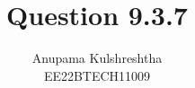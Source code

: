 \documentclass[]{article}
\title{Question 9.3.7}
\author{Anupama Kulshreshtha \\ EE22BTECH11009}
\date{}
\begin{document}
\maketitle
\providecommand{\pr}[1]{\ensuremath{\Pr\left(#1\right)}}
\providecommand{\prt}[2]{\ensuremath{p_{#1}^{\left(#2\right)} }}        %
\providecommand{\qfunc}[1]{\ensuremath{Q\left(#1\right)}}
\providecommand{\sbrak}[1]{\ensuremath{{}\left[#1\right]}}
\providecommand{\lsbrak}[1]{\ensuremath{{}\left[#1\right.}}
\providecommand{\rsbrak}[1]{\ensuremath{{}\left.#1\right]}}
\providecommand{\brak}[1]{\ensuremath{\left(#1\right)}}
\providecommand{\lbrak}[1]{\ensuremath{\left(#1\right.}}
\providecommand{\rbrak}[1]{\ensuremath{\left.#1\right)}}
\providecommand{\cbrak}[1]{\ensuremath{\left\{#1\right\}}}
\providecommand{\lcbrak}[1]{\ensuremath{\left\{#1\right.}}
\providecommand{\rcbrak}[1]{\ensuremath{\left.#1\right\}}}
\newcommand{\sgn}{\mathop{\mathrm{sgn}}}
\providecommand{\abs}[1]{\left\vert#1\right\vert}
\providecommand{\res}[1]{\Res\displaylimits_{#1}} 
\providecommand{\norm}[1]{\left\lVert#1\right\rVert}
\providecommand{\mtx}[1]{\mathbf{#1}}
\providecommand{\mean}[1]{E\left[ #1 \right]}
\providecommand{\cond}[2]{#1\middle|#2}
\providecommand{\fourier}{\overset{\mathcal{F}}{ \rightleftharpoons}}
\newenvironment{amatrix}[1]{%
  \left(\begin{array}{@{}*{#1}{c}|c@{}}
}{%
  \end{array}\right)
}
\newcommand{\solution}{\noindent \textbf{Solution: }}
\newcommand{\cosec}{\,\text{cosec}\,}
\providecommand{\dec}[2]{\ensuremath{\overset{#1}{\underset{#2}{\gtrless}}}}
\newcommand{\myvec}[1]{\ensuremath{\begin{pmatrix}#1\end{pmatrix}}}
\newcommand{\mydet}[1]{\ensuremath{\begin{vmatrix}#1\end{vmatrix}}}
\newcommand{\myaugvec}[2]{\ensuremath{\begin{amatrix}{#1}#2\end{amatrix}}}
\providecommand{\rank}{\text{rank}}
\providecommand{\pr}[1]{\ensuremath{\Pr\left(#1\right)}}
\providecommand{\qfunc}[1]{\ensuremath{Q\left(#1\right)}}
	\newcommand*{\permcomb}[4][0mu]{{{}^{#3}\mkern#1#2_{#4}}}
\newcommand*{\perm}[1][-3mu]{\permcomb[#1]{P}}
\newcommand*{\comb}[1][-1mu]{\permcomb[#1]{C}}
\end{document}
